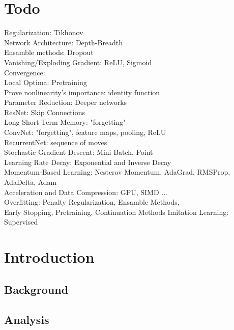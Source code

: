 \documentclass[titlepage]{article}
\begin{document}
\printnomenclature[3cm]

\newpage

\section*{\huge Todo}

\noindent
Regularization: Tikhonov \\
Network Architecture: Depth-Breadth \\
Ensamble methods: Dropout \\
Vanishing/Exploding Gradient: ReLU, Sigmoid \\
Convergence: \\ 
Local Optima: Pretraining \\
Prove nonlinearity's importance: identity function \\
Parameter Reduction: Deeper networks \\
ResNet: Skip Connections \\
\bigskip
Long Short-Term Memory: "forgetting" \\
ConvNet: "forgetting", feature maps, pooling, ReLU \\
RecurrentNet: sequence of moves \\
Stochastic Gradient Descent: Mini-Batch, Point \\
Learning Rate Decay: Exponential and Inverse Decay \\
Momentum-Based Learning: Nesterov Momentum, AdaGrad, RMSProp, \\ AdaDelta, Adam \\
Acceleration and Data Compression: GPU, SIMD ... \\
Overfitting: Penalty Regularization, Ensamble Methods, \\ Early Stopping, Pretraining, Continuation Methods 
Imitation Learning: Supervised 

\clearpage
{}

\newpage
\section{Introduction}

\subsection{Background}
\subsection{Analysis}

\newpage



\end{document}
